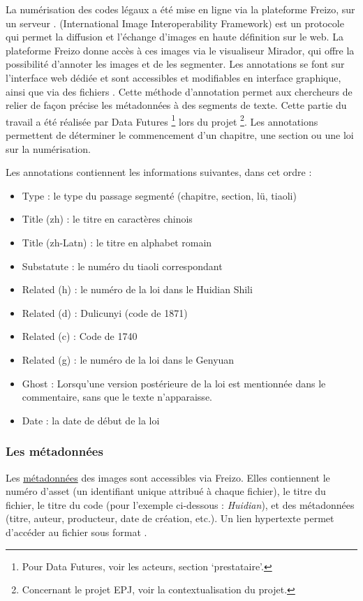 La numérisation des codes légaux a été mise en ligne via la plateforme Freizo, sur un serveur \IIIF. \IIIF (International Image Interoperability Framework) est un protocole qui permet la diffusion et l’échange d’images en haute définition sur le web. La plateforme Freizo donne accès à ces images via le visualiseur Mirador, qui offre la possibilité d’annoter les images et de les segmenter. Les annotations se font sur l’interface web dédiée et sont accessibles et modifiables en interface graphique, ainsi que via des fichiers \JSON. Cette méthode d’annotation permet aux chercheurs de relier de façon précise les métadonnées à des segments de texte. Cette partie du travail a été réalisée par Data Futures \footnote{Pour Data Futures, voir les acteurs, section ‘prestataire’.} lors du projet \EPJ \footnote{Concernant le projet EPJ, voir la contextualisation du projet.}. Les annotations permettent de déterminer le commencement d’un chapitre, une section ou une loi sur la numérisation. 

Les annotations contiennent les informations suivantes, dans cet ordre : 
\begin{itemize}
    \item   Type : le type du passage segmenté (chapitre, section, lü, tiaoli)
    \item Title (zh) : le titre en caractères chinois
    \item Title (zh-Latn) : le titre en alphabet romain
    \item Substatute : le numéro du tiaoli correspondant
    \item Related (h) : le numéro de la loi dans le Huidian Shili
    \item  Related (d) : Dulicunyi (code de 1871)
    \item  Related (c) : Code de 1740
    \item  Related (g) : le numéro de la loi dans le Genyuan
    \item Ghost : Lorsqu’une version postérieure de la loi est mentionnée dans le commentaire, sans que le texte n’apparaisse. 
    \item Date : la date de début de la loi
\end{itemize}

\subsubsection{Les métadonnées}
Les \href{https://duli-cunyi.freizo.org/browse.cgi}{métadonnées} des images \IIIF sont accessibles via Freizo. Elles contiennent le numéro d’asset (un identifiant unique attribué à chaque fichier), le titre du fichier, le titre du code (pour l’exemple ci-dessous : \textit{Huidian}), et des métadonnées (titre, auteur, producteur, date de création, etc.). Un lien hypertexte permet d’accéder au fichier sous format \PDF. 


